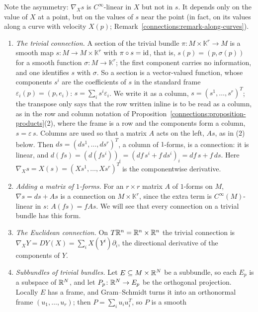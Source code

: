 Note the asymmetry: $\nabla_Xs$ is $C^\infty$-linear in $X$ but not in $s$. It depends only on the value of $X$ at a point, but on the values of $s$ near the point (in fact, on
its values along a curve with velocity $X(p)$; Remark~\ref{connections:remark-along-curves}).

\begin{example}\label{connections:example-connections}
\begin{enumerate}
\item \emph{The trivial connection.} A section of the trivial bundle $\pi \colon M \times \mathbb{K}^r \to M$ is a smooth map $s \colon M \to M \times \mathbb{K}^r$ with $\pi \circ s = \mathrm{id}$, that
is, $s(p) = (p, \sigma(p))$ for a smooth function $\sigma \colon M \to \mathbb{K}^r$; the first component carries no information, and one identifies $s$ with $\sigma$. So a section is a vector-valued
function, whose components $s^i$ are the coefficients of $s$ in the standard frame $\varepsilon_i(p) = (p, e_i)$: $s = \sum_is^i\varepsilon_i$. We write it as a column,
$s = (s^1, \ldots, s^r)^T$; the transpose only says that the row written inline is to be read as a column, as in the row and column notation of
Proposition~\ref{connections:proposition-products}(2), where the frame is a row and the components form a column, $s = \varepsilon\,s$. Columns are used so that a matrix $A$ acts on the left, $As$, as in (2)
below. Then $ds = (ds^1, \ldots, ds^r)^T$, a column of $1$-forms, is a connection: it is linear, and $d(fs) = (d(fs^i))_i = (df\,s^i + f\,ds^i)_i = df\,s + f\,ds$. Here $\nabla_Xs = X(s) = (Xs^1, \ldots, Xs^r)^T$
is the componentwise derivative.
\item \emph{Adding a matrix of $1$-forms.} For an $r \times r$ matrix $A$ of $1$-forms on $M$, $\nabla s = ds + As$ is a connection on $M \times \mathbb{K}^r$, since the extra term
is $C^\infty(M)$-linear in $s$: $A(fs) = fAs$. We will see that every connection on a trivial bundle has this form.
\item \emph{The Euclidean connection.} On $T\mathbb{R}^n = \mathbb{R}^n \times \mathbb{R}^n$ the trivial connection is $\nabla_XY = DY(X) = \sum_iX(Y^i)\partial_i$, the directional derivative of
the components of $Y$.
\item \emph{Subbundles of trivial bundles.} Let $E \subseteq M \times \mathbb{R}^N$ be a subbundle, so each $E_p$ is a subspace of $\mathbb{R}^N$, and let $P_p \colon \mathbb{R}^N \to E_p$ be the
orthogonal projection. Locally $E$ has a frame, and Gram--Schmidt turns it into an orthonormal frame $(u_1, \ldots, u_r)$; then $P = \sum_iu_iu_i^T$, so $P$ is a smooth

\end{enumerate}
\end{example}
